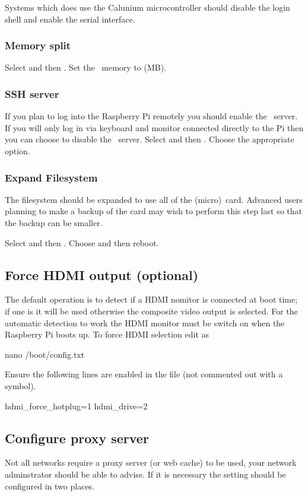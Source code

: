 Systems which does use the Calunium microcontroller should disable the
login shell and enable the serial interface.

\subsubsection{Memory split}
Select  and then . Set the \gpu\ memory to  (MB).

\subsubsection{SSH server}
If you plan to log into the Raspberry Pi remotely you should enable
the \ssh\ server. If you will only log in via keyboard and monitor
connected directly to the Pi then you can choose to disable the \ssh\
server.
Select  and then . Choose the
appropriate option.

\subsubsection{Expand Filesystem}
The filesystem should be expanded to use all of the (micro)\sd\
card. Advanced users planning to make a backup of the card may wish to
perform this step last so that the backup can be smaller.

Select  and then . Choose 
 and then reboot.


\subsection{Force HDMI output (optional)}
The default operation is to detect if a HDMI nomitor is connected at
boot time; if one is it will be used otherwise the composite video
output is selected. For the automatic detection to work the HDMI
monitor must be switch on when the Raspberry Pi boots up. To force
HDMI selection edit \filename{/boot/config.txt} as \rootUser
\begin{Cmd}
nano /boot/config.txt
\end{Cmd}

Ensure the following lines are enabled in the file (not commented out
with a \code{\#} symbol).
\begin{Cmd}
hdmi_force_hotplug=1
hdmi_drive=2  
\end{Cmd}

\subsection{Configure proxy server}
Not all networks require a proxy server (or web cache) to be used,
your network adminstrator should be able to advise. If it is necessary
the setting should be configured in two places.


